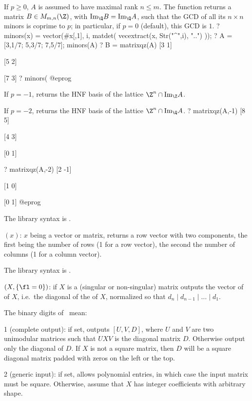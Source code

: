 If $p \geq 0$, $A$ is assumed to have maximal rank $n\leq m$. The function
returns a matrix $B\in M_{m,n}(\Z)$, with $\text{Im}_\Q B = \text{Im}_\Q A$,
such that the GCD of all its $n\times n$ minors is coprime to
$p$; in particular, if $p = 0$ (default), this GCD is $1$.
\bprog
? minors(x) = vector(#x[,1], i, matdet( vecextract(x, Str("^",i), "..") ));
? A = [3,1/7; 5,3/7; 7,5/7]; minors(A)
? B = matrixqz(A)
[3 1]

[5 2]

[7 3]
? minors(%
@eprog

If $p=-1$, returns the HNF basis of the lattice $\Z^n \cap \text{Im}_\Z A$.

If $p=-2$, returns the HNF basis of the lattice $\Z^n \cap \text{Im}_\Q A$.
\bprog
? matrixqz(A,-1)
[8 5]

[4 3]

[0 1]

? matrixqz(A,-2)
[2 -1]

[1 0]

[0 1]
@eprog

The library syntax is .

$(x)$: \label{se:matsize}$x$ being a vector or matrix, returns a row vector
with two components, the first being the number of rows (1 for a row vector),
the second the number of columns (1 for a column vector).

The library syntax is .

$(X,\{\fl=0\})$: \label{se:matsnf}if $X$ is a (singular or non-singular) matrix outputs the vector of
 of $X$, i.e.~the diagonal of the
 of $X$, normalized so that $d_n \mid d_{n-1} \mid
\ldots \mid d_1$.

The binary digits of \fl\ mean:

1 (complete output): if set, outputs $[U,V,D]$, where $U$ and $V$ are two
unimodular matrices such that $UXV$ is the diagonal matrix $D$. Otherwise
output only the diagonal of $D$. If $X$ is not a square matrix, then $D$
will be a square diagonal matrix padded with zeros on the left or the top.

2 (generic input): if set, allows polynomial entries, in which case the
input matrix must be square. Otherwise, assume that $X$ has integer
coefficients with arbitrary shape.


